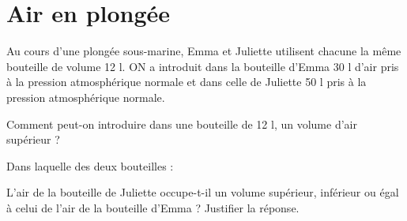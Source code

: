 \section{Air en plongée}

Au cours d'une plongée sous-marine, Emma et Juliette utilisent chacune la même bouteille de volume 12 l.
ON a introduit dans la bouteille d'Emma 30 l d'air pris à la pression atmosphérique normale et dans celle de Juliette 50 l pris à la pression atmosphérique normale.

\begin{questions}
	\question Comment peut-on introduire dans une bouteille de 12 l, un volume d'air supérieur ?
	\fillwithdottedlines{3cm}
	
	\question Dans laquelle des deux bouteilles :

	\question L'air de la bouteille de Juliette occupe-t-il un volume supérieur, inférieur ou égal à celui de l'air de la bouteille d'Emma ? Justifier la réponse.
	
	\fillwithdottedlines{4cm}
\end{questions}